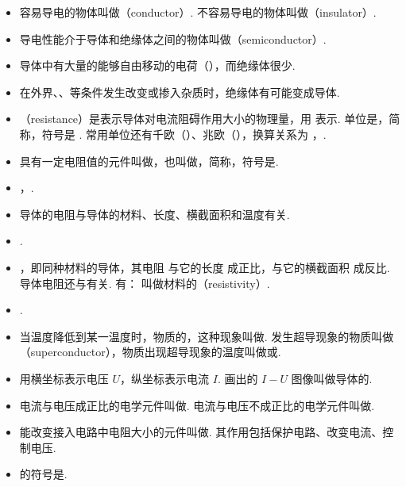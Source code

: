 \begin{itemize}
\item 容易导电的物体叫做（conductor）. 不容易导电的物体叫做（insulator）.
\item 导电性能介于导体和绝缘体之间的物体叫做（semiconductor）.
\item 导体中有大量的能够自由移动的电荷（），而绝缘体很少.
\item 在外界、、等条件发生改变或掺入杂质时，绝缘体有可能变成导体.
\item {}（resistance）是表示导体对电流阻碍作用大小的物理量，用  表示. 单位是，简称，符号是 \blue{$\bm\Omega$}. 常用单位还有千欧（）、兆欧（），换算关系为 ，.
\item 具有一定电阻值的元件叫做，也叫做，简称，符号是\resistance. 
\item {}，.
\item 导体的电阻与导体的材料、长度、横截面积和温度有关.
\item {}.
\item {}，即同种材料的导体，其电阻  与它的长度  成正比，与它的横截面积  成反比. 导体电阻还与有关. 有：
\blue{$\bm\rho$} 叫做材料的（resistivity）.
\item {}.
\item 当温度降低到某一温度时，物质的，这种现象叫做. 发生超导现象的物质叫做（superconductor），物质出现超导现象的温度叫做或.
\item 用横坐标表示电压 $U$，纵坐标表示电流 $I$. 画出的 $I-U$ 图像叫做导体的.
\item 电流与电压成正比的电学元件叫做. 电流与电压不成正比的电学元件叫做.
\item 能改变接入电路中电阻大小的元件叫做. 其作用包括保护电路、改变电流、控制电压.
\item {}的符号是\slidingrheostat.
\end{itemize}